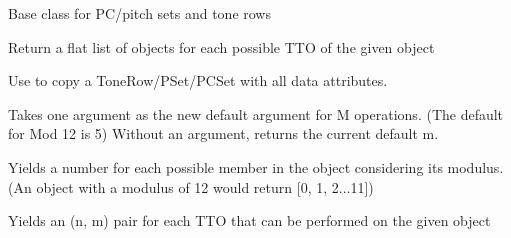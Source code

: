\documentclass[letterpaper,10pt,english]{sphinxmanual}
\begin{document}

\begin{fulllineitems}
\label{_templates/core:core.SetRowBase}
Base class for PC/pitch sets and tone rows

\begin{fulllineitems}
\label{_templates/core:core.SetRowBase.all_rotations}
Return a flat list of objects for each possible TTO of the given object

\end{fulllineitems}


\begin{fulllineitems}
\label{_templates/core:core.SetRowBase.copy}
Use to copy a ToneRow/PSet/PCSet with all data attributes.

\end{fulllineitems}


\begin{fulllineitems}
\label{_templates/core:core.SetRowBase.default_m}
Takes one argument as the new default argument for M operations.
(The default for Mod 12 is 5)
Without an argument, returns the current default m.

\end{fulllineitems}


\begin{fulllineitems}
\label{_templates/core:core.SetRowBase.each_n}
Yields a number for each possible member in the object considering its
modulus.
(An object with a modulus of 12 would return {[}0, 1, 2...11{]})

\end{fulllineitems}


\begin{fulllineitems}
\label{_templates/core:core.SetRowBase.each_tto}
Yields an (n, m) pair for each TTO that can be performed on the given
object


\end{fulllineitems}
\end{fulllineitems}
\end{document}
